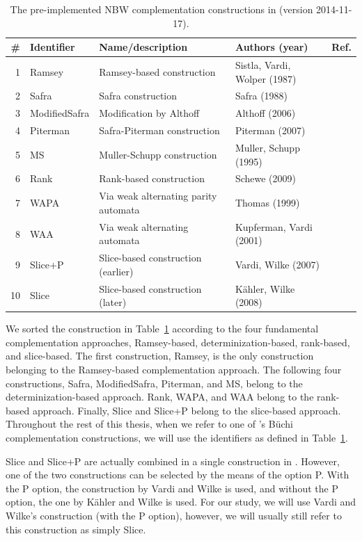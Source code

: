 \begin{table}[htb!]
\centering
\begin{tabular}{rlllr}
\hline
\# & Identifier & Name/description & Authors (year) & Ref. \\
\hline
1 & Ramsey & Ramsey-based construction & Sistla, Vardi, Wolper (1987) & \cite{PrasadSistla1987217} \\
2 & Safra & Safra construction & Safra (1988) & \cite{1988_safra_1} \\
3 & ModifiedSafra & Modification by Althoff & Althoff (2006) & \cite{2006_althoff} \\
4 & Piterman & Safra-Piterman construction & Piterman (2007) & \cite{2007_piterman} \\
5 & MS & Muller-Schupp construction & Muller, Schupp (1995) & \cite{Muller199569} \\
6 & Rank & Rank-based construction & Schewe (2009) & \cite{schewe2009buchi} \\
7 & WAPA & Via weak alternating parity automata & Thomas (1999) & \cite{1999_thomas} \\
8 & WAA & Via weak alternating automata & Kupferman, Vardi (2001) & \cite{Kupferman:2001} \\
9 & Slice+P & Slice-based construction (earlier) & Vardi, Wilke (2007) & \cite{vardi2007automata} \\
10 & Slice & Slice-based construction (later) & Kähler, Wilke (2008) & \cite{2008_kaehler} \\
\hline
\end{tabular}
\caption{The pre-implemented NBW complementation constructions in \goal{} (version 2014-11-17).}
\label{goal_constructions}
\end{table}

We sorted the construction in Table~\ref{goal_constructions} according to the four fundamental complementation approaches, Ramsey-based, determinization-based, rank-based, and slice-based. The first construction, Ramsey, is the only construction belonging to the Ramsey-based complementation approach. The following four constructions, Safra, ModifiedSafra, Piterman, and MS, belong to the determinization-based approach. Rank, WAPA, and WAA belong to the rank-based approach. Finally, Slice and Slice+P belong to the slice-based approach. Throughout the rest of this thesis, when we refer to one of \goal's Büchi complementation constructions, we will use the identifiers as defined in Table~\ref{goal_constructions}.

Slice and Slice+P are actually combined in a single construction in \goal. However, one of the two constructions can be selected by the means of the option P. With the P option, the construction by Vardi and Wilke is used, and without the P option, the one by Kähler and Wilke is used. For our study, we will use Vardi and Wilke's construction (with the P option), however, we will usually still refer to this construction as simply Slice.

